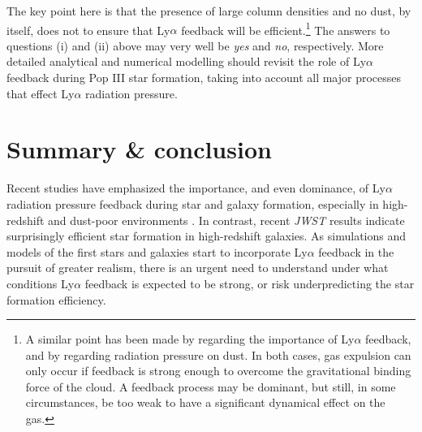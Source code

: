 \documentclass[fleqn,usenatbib]{mnras}
\newcommand\HI{\ion{H}{I}\xspace} %
\begin{document}
The key point here is that the presence of large \HI column densities and no dust, by itself, does not to ensure that Ly$\alpha$ feedback will be efficient.\footnote{A similar point has been made by \cite{Smith2019} regarding the importance of Ly$\alpha$ feedback, and by \cite{krumholz2018resolution} regarding radiation pressure on dust. In both cases, gas expulsion can only occur if feedback is strong enough to overcome the gravitational binding force of the cloud. A feedback process may be dominant, but still, in some circumstances, be too weak to have a significant dynamical effect on the gas. } The answers to questions (i) and (ii) above may very well be \textit{yes} and \textit{no}, respectively. More detailed analytical and numerical modelling should revisit the role of Ly$\alpha$ feedback during Pop III star formation, taking into account all major processes that effect Ly$\alpha$ radiation pressure. 

\section{Summary \& conclusion}
\label{Summary and conclusion}

Recent studies have emphasized the importance, and even dominance, of Ly$\alpha$ radiation pressure feedback during star and galaxy formation, especially in high-redshift and dust-poor environments \citep[e.g.][]{Smith2017, Kimm2018, Kimm2019, Tomaselli2021, Nebrin2022, Kapoor2023, Thomson2024}. In contrast, recent \textit{JWST} results indicate surprisingly efficient star formation in high-redshift galaxies. As simulations and models of the first stars and galaxies start to incorporate Ly$\alpha$ feedback in the pursuit of greater realism, there is an urgent need to understand under what conditions Ly$\alpha$ feedback is expected to be strong, or risk underpredicting the star formation efficiency.
\end{document}
